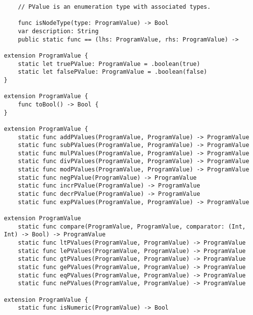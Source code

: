 \begin{verbatim}
	// PValue is an enumeration type with associated types.

	func isNodeType(type: ProgramValue) -> Bool
	var	description: String
	public static func == (lhs: ProgramValue, rhs: ProgramValue) -> 

extension ProgramValue {
    static let truePValue: ProgramValue = .boolean(true)
    static let falsePValue: ProgramValue = .boolean(false)
}

extension ProgramValue {
    func toBool() -> Bool {
}

extension ProgramValue {
    static func addPValues(ProgramValue, ProgramValue) -> ProgramValue
    static func subPValues(ProgramValue, ProgramValue) -> ProgramValue
    static func mulPValues(ProgramValue, ProgramValue) -> ProgramValue
    static func divPValues(ProgramValue, ProgramValue) -> ProgramValue
    static func modPValues(ProgramValue, ProgramValue) -> ProgramValue
    static func negPValue(ProgramValue) -> ProgramValue
    static func incrPValue(ProgramValue) -> ProgramValue
    static func decrPValue(ProgramValue) -> ProgramValue
    static func expPValues(ProgramValue, ProgramValue) -> ProgramValue

extension ProgramValue
    static func compare(ProgramValue, ProgramValue, comparator: (Int, Int) -> Bool) -> ProgramValue 
    static func ltPValues(ProgramValue, ProgramValue) -> ProgramValue
    static func lePValues(ProgramValue, ProgramValue) -> ProgramValue
    static func gtPValues(ProgramValue, ProgramValue) -> ProgramValue
    static func gePValues(ProgramValue, ProgramValue) -> ProgramValue
    static func eqPValues(ProgramValue, ProgramValue) -> ProgramValue
    static func nePValues(ProgramValue, ProgramValue) -> ProgramValue 

extension ProgramValue {
    static func isNumeric(ProgramValue) -> Bool
\end{verbatim}

   

